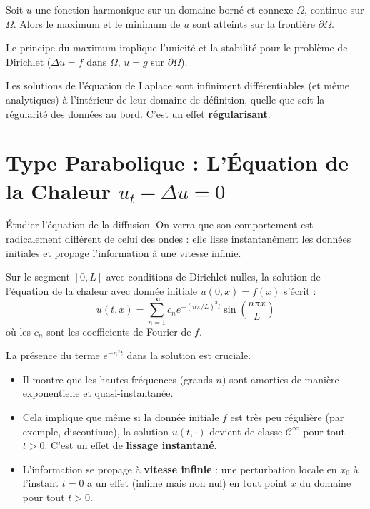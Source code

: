 \begin{theorem}
    Soit $u$ une fonction harmonique sur un domaine borné et connexe $\Omega$, continue sur $\bar{\Omega}$. Alors le maximum et le minimum de $u$ sont atteints sur la frontière $\partial \Omega$.
\end{theorem}

\begin{corollary}
    Le principe du maximum implique l'unicité et la stabilité pour le problème de Dirichlet ($\Delta u=f$ dans $\Omega$, $u=g$ sur $\partial \Omega$).
\end{corollary}

\begin{theorem}
    Les solutions de l'équation de Laplace sont infiniment différentiables (et même analytiques) à l'intérieur de leur domaine de définition, quelle que soit la régularité des données au bord. C'est un effet \textbf{régularisant}.
\end{theorem}

\section{Type Parabolique : L'Équation de la Chaleur $u_t - \Delta u = 0$}

\begin{objectif}
    Étudier l'équation de la diffusion. On verra que son comportement est radicalement différent de celui des ondes : elle lisse instantanément les données initiales et propage l'information à une vitesse infinie.
\end{objectif}

\begin{proposition}
    Sur le segment $[0,L]$ avec conditions de Dirichlet nulles, la solution de l'équation de la chaleur avec donnée initiale $u(0,x)=f(x)$ s'écrit :
    $$ u(t,x) = \sum_{n=1}^\infty c_n e^{-(n\pi/L)^2 t} \sin\left(\frac{n\pi x}{L}\right) $$
    où les $c_n$ sont les coefficients de Fourier de $f$.
\end{proposition}

\begin{remark}
    La présence du terme $e^{-n^2 t}$ dans la solution est cruciale.
    \begin{itemize}
        \item Il montre que les hautes fréquences (grands $n$) sont amorties de manière exponentielle et quasi-instantanée.
        \item Cela implique que même si la donnée initiale $f$ est très peu régulière (par exemple, discontinue), la solution $u(t, \cdot)$ devient de classe $\mathcal{C}^\infty$ pour tout $t>0$. C'est un effet de \textbf{lissage instantané}.
        \item L'information se propage à \textbf{vitesse infinie} : une perturbation locale en $x_0$ à l'instant $t=0$ a un effet (infime mais non nul) en tout point $x$ du domaine pour tout $t>0$.
    \end{itemize}
\end{remark}

